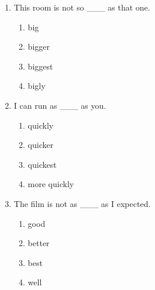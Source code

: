 \documentclass[11pt,a4paper]{ctexart}
\begin{document}
\begin{enumerate}[leftmargin=*,itemsep=4pt]
\begin{enumerate}[label=\Alph*.,leftmargin=2em,itemsep=1pt,topsep=2pt]
\item tallly
\end{enumerate}
\item This room is not so \_\_\_ as that one.
\begin{enumerate}[label=\Alph*.,leftmargin=2em,itemsep=1pt,topsep=2pt]
\item big
\item bigger
\item biggest
\item bigly
\end{enumerate}
\item I can run as \_\_\_ as you.
\begin{enumerate}[label=\Alph*.,leftmargin=2em,itemsep=1pt,topsep=2pt]
\item quickly
\item quicker
\item quickest
\item more quickly
\end{enumerate}
\item The film is not as \_\_\_ as I expected.
\begin{enumerate}[label=\Alph*.,leftmargin=2em,itemsep=1pt,topsep=2pt]
\item good
\item better
\item best
\item well
\end{enumerate}
\end{enumerate}
\end{document}
